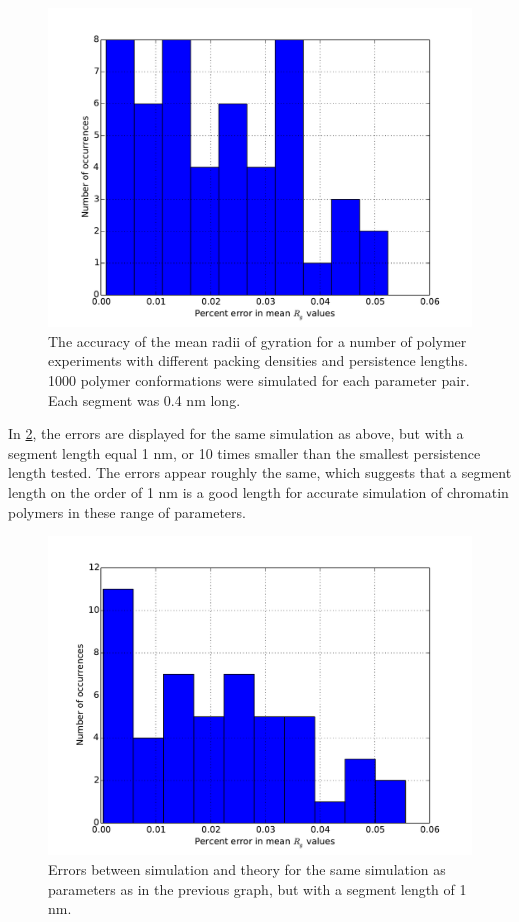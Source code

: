 \documentclass[11pt]{article}
\begin{document}
\begin{figure}[htb]
\centering
\includegraphics[width=.9\linewidth]{./images/accuracy1.pdf}
\caption{\label{fig-accuracy1}The accuracy of the mean radii of gyration for a number of polymer experiments with different packing densities and persistence lengths. 1000 polymer conformations were simulated for each parameter pair. Each segment was 0.4 nm long.}
\end{figure}

In \ref{fig-accuracy2}, the errors are displayed for the same
simulation as above, but with a segment length equal 1 nm, or 10 times
smaller than the smallest persistence length tested. The errors appear
roughly the same, which suggests that a segment length on the order of
1 nm is a good length for accurate simulation of chromatin polymers in
these range of parameters.

\begin{figure}[htb]
\centering
\includegraphics[width=.9\linewidth]{./images/accuracy2.pdf}
\caption{\label{fig-accuracy2}Errors between simulation and theory for the same simulation as parameters as in the previous graph, but with a segment length of 1 nm.}
\end{figure}
\end{document}
